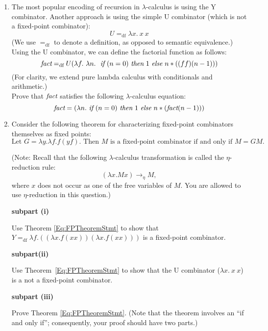 \documentclass[11pt, oneside]{article}   	%
\begin{document}
\begin{enumerate}[label=\bf\Alph*]
\item The most popular encoding of recursion in $\lambda$-calculus
    is using the Y combinator.
    Another approach is using the simple U combinator (which is
    not a fixed-point combinator):
    $$U =_\textrm{df} \lambda x.\ x\ x$$
    (We use $=_\textrm{df}$ to denote a definition, as opposed to
    semantic equivalence.)
    Using the U combinator, we can define the factorial
    function as follows:
    $$\emph{fact} =_\textrm{df} U(\lambda f.\ \lambda n.\ ~\emph{if}~(n=0)~\emph{then}~1~\emph{else}~n*((f f) (n-1)))$$
    (For clarity, we extend pure lambda calculus
    with conditionals and arithmetic.)\\
    Prove that $\emph{fact}$ satisfies
    the following $\lambda$-calculus equation:
    $$\emph{fact} = (\lambda n. ~\emph{if}~(n=0)~\emph{then}~1~\emph{else}~n*(\emph{fact} (n-1)))$$

\item
Consider the following theorem for characterizing
fixed-point combinators themselves as fixed points:
\begin{equation}
  \label{Eq:FPTheoremStmt}
  \textrm{Let $G = \lambda y . \lambda f . f(yf)$.
  Then $M$ is a fixed-point combinator if and only if $M = GM$.}
\end{equation}

\noindent
(Note: Recall that the following $\lambda$-calculus transformation
is called the $\eta$-reduction rule:
\[
  (\lambda x.Mx) \rightarrow_\eta M,
\]
where $x$ does not occur as one of the free variables of $M$.
You are allowed to use $\eta$-reduction in this question.)

\medskip

\noindent
{\bf subpart (i)}

\noindent
Use Theorem \ref{Eq:FPTheoremStmt} to show that
$Y =_\textrm{df} \lambda f . (( \lambda x.f(xx) )( \lambda x.f(xx) ))$
is a fixed-point combinator.

\medskip

\noindent
{\bf subpart(ii)}

\noindent
Use Theorem~\ref{Eq:FPTheoremStmt} to show
that the U combinator ($\lambda x.\ x\ x$)
is a not a fixed-point combinator.

\noindent
{\bf subpart (iii)}

\noindent
Prove Theorem \ref{Eq:FPTheoremStmt}.
(Note that the theorem involves an ``if and only if'';
consequently, your proof should have two parts.)


\end{enumerate}
\end{document}
